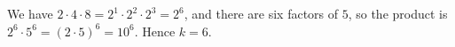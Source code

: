 We have $2\cdot4\cdot8=2^1\cdot2^2\cdot2^3=2^6$, and there are six factors of $5$, so the product is $2^6\cdot5^6=(2\cdot5)^6=10^6$. Hence $k=\boxed{6}$.
